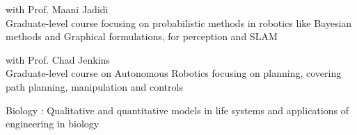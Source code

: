 \begin{cventries}
{
\begin{cvitems}
    \item { with Prof. Maani Jadidi \hfill {}\\ 
    Graduate-level course focusing on probabilistic methods in robotics like Bayesian methods and Graphical formulations, for perception and SLAM}
    \item { with Prof. Chad Jenkins \hfill {}\\ 
    Graduate-level course on Autonomous Robotics focusing on planning, covering path planning, manipulation and controls}
\end{cvitems}
}

{
\begin{cvitems}
    \item Biology : Qualitative and quantitative models in life systems and applications of engineering in biology \hfill {}
\end{cvitems}
}
\end{cventries}
